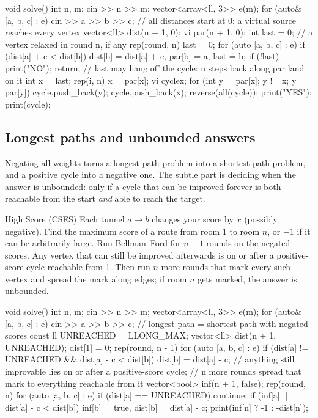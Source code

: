 \begin{code}
void solve() {
    int n, m;
    cin >> n >> m;
    vector<array<ll, 3>> e(m);
    for (auto& [a, b, c] : e) cin >> a >> b >> c;
    // all distances start at 0: a virtual source reaches every vertex
    vector<ll> dist(n + 1, 0);
    vi par(n + 1, 0);
    int last = 0;  // a vertex relaxed in round n, if any
    rep(round, n) {
        last = 0;
        for (auto [a, b, c] : e)
            if (dist[a] + c < dist[b])
                dist[b] = dist[a] + c, par[b] = a, last = b;
    }
    if (!last) {
        print("NO");
        return;
    }
    // last may hang off the cycle: n steps back along par land on it
    int x = last;
    rep(i, n) x = par[x];
    vi cycle{x};
    for (int y = par[x]; y != x; y = par[y]) cycle.push_back(y);
    cycle.push_back(x);
    reverse(all(cycle));
    print("YES");
    print(cycle);
}
\end{code}


\subsection{Longest paths and unbounded answers}

Negating all weights turns a longest-path problem into a shortest-path problem, and a positive cycle into a negative one. The
subtle part is deciding when the answer is unbounded: only if a cycle that can be improved forever is both reachable from the
start \emph{and} able to reach the target.

\begin{problem}{High Score (CSES)}
Each tunnel $a \to b$ changes your score by $x$ (possibly negative). Find the maximum score of a route from room 1 to room $n$,
or $-1$ if it can be arbitrarily large.
\solution Run Bellman--Ford for $n - 1$ rounds on the negated scores. Any vertex that can still be improved afterwards is on or
after a positive-score cycle reachable from 1. Then run $n$ more rounds that mark every such vertex and spread the mark along
edges; if room $n$ gets marked, the answer is unbounded.
\end{problem}

\begin{code}
void solve() {
    int n, m;
    cin >> n >> m;
    vector<array<ll, 3>> e(m);
    for (auto& [a, b, c] : e) cin >> a >> b >> c;
    // longest path = shortest path with negated scores
    const ll UNREACHED = LLONG_MAX;
    vector<ll> dist(n + 1, UNREACHED);
    dist[1] = 0;
    rep(round, n - 1)
        for (auto [a, b, c] : e)
            if (dist[a] != UNREACHED && dist[a] - c < dist[b])
                dist[b] = dist[a] - c;
    // anything still improvable lies on or after a positive-score cycle;
    // n more rounds spread that mark to everything reachable from it
    vector<bool> inf(n + 1, false);
    rep(round, n)
        for (auto [a, b, c] : e) {
            if (dist[a] == UNREACHED) continue;
            if (inf[a] || dist[a] - c < dist[b])
                inf[b] = true, dist[b] = dist[a] - c;
        }
    print(inf[n] ? -1 : -dist[n]);
}
\end{code}

